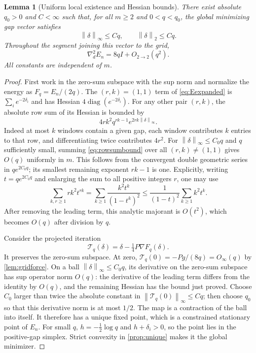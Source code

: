\documentclass[11pt,a4paper]{article}
\newtheorem{lemma}[theorem]{Lemma}
\theoremstyle{definition}
\theoremstyle{remark}
\newcommand{\diag}{\operatorname{diag}}
\newcommand{\norm}[1]{\left\lVert#1\right\rVert}
\begin{document}
\begin{lemma}[Uniform local existence and Hessian bounds]
\label{lem:local}
There exist absolute $q_0>0$ and $C<\infty$ such that, for all $m\ge2$
and $0<q<q_0$, the global minimizing gap vector satisfies
\begin{equation}
 \norm{\delta}_\infty\le Cq,\qquad\norm{\delta}_2\le Cq.
 \label{eq:deltabounds}
\end{equation}
Throughout the segment joining this vector to the grid,
\begin{equation}
 \nabla_d^2E_n=8qI+O_{2\to2}(q^2).
 \label{eq:hessian}
\end{equation}
All constants are independent of $m$.
\end{lemma}
\begin{proof}
First work in the zero-sum subspace with the sup norm and normalize the
energy as $F_q=E_n/(2q)$. The $(r,k)=(1,1)$ term of
\eqref{eq:Eexpanded} is
$\sum_i e^{-2\delta_i}$ and has Hessian
$4\diag(e^{-2\delta_i})$.
For any other pair $(r,k)$, the absolute row sum of its Hessian is bounded
by
\begin{equation}
 4r k^2q^{rk-1}e^{2rk\norm{\delta}_\infty}.
 \label{eq:rowsumbound}
\end{equation}
Indeed at most $k$ windows contain a given gap, each window contributes
$k$ entries to that row, and differentiating twice contributes $4r^2$.
For $\norm{\delta}_\infty\le C_0q$ and $q$ sufficiently small, summing
\eqref{eq:rowsumbound} over all $(r,k)\ne(1,1)$ gives $O(q)$ uniformly in
$m$. This follows from the convergent double geometric series in
$q e^{2C_0q}$; its smallest remaining exponent $rk-1$ is one. Explicitly, writing
$t=qe^{2C_0q}$ and enlarging the sum to all positive integers $r$,
one may use
\[
 \sum_{k,r\ge1}rk^2t^{rk}
 =\sum_{k\ge1}\frac{k^2t^k}{(1-t^k)^2}
 \le\frac1{(1-t)^2}\sum_{k\ge1}k^2t^k.
\]
After removing the leading term, this analytic majorant is $O(t^2)$,
which becomes $O(q)$ after division by $q$.

Consider the projected iteration
\begin{equation}
 \mathcal T_q(\delta)=\delta-\tfrac14P\nabla F_q(\delta).
 \label{eq:contractmap}
\end{equation}
It preserves the zero-sum subspace. At zero,
$\mathcal T_q(0)=-Pg/(8q)=O_\infty(q)$ by
\cref{lem:gridforce}. On a ball $\norm{\delta}_\infty\le C_0q$,
its derivative on the zero-sum subspace has sup operator norm $O(q)$:
the derivative of the leading term differs from the identity by $O(q)$,
and the remaining Hessian has the bound just proved. Choose $C_0$ larger
than twice the absolute constant in $\norm{\mathcal T_q(0)}_\infty\le Cq$;
then choose $q_0$ so that this derivative norm is at most $1/2$.
The map is a contraction of the ball into itself. It therefore has a
unique fixed point, which is a constrained stationary point of $E_n$.
For small $q$, $h=-\tfrac12\log q$ and $h+\delta_i>0$, so the point lies
in the positive-gap simplex. Strict convexity in \cref{prop:unique} makes
it the global minimizer.


\end{proof}
\end{document}

